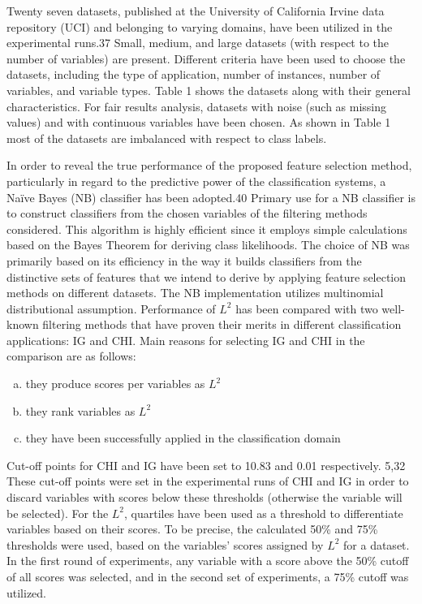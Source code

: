 \documentclass[review]{elsarticle}
\begin{document}
Twenty seven datasets, published at the University of California Irvine data repository (UCI) and belonging to varying domains, have been utilized in the experimental runs.37  Small, medium, and large datasets (with respect to the number of variables) are present. Different criteria have been used to choose the datasets, including the type of application, number of instances, number of variables, and variable types. Table 1 shows the datasets along with their general characteristics.  For fair results analysis, datasets with noise (such as missing values) and with continuous variables have been chosen. As shown in Table 1 most of the datasets are imbalanced with respect to class labels.

In order to reveal the true performance of the proposed feature selection method, particularly in regard to the predictive power of the classification systems, a Naïve Bayes (NB) classifier has been adopted.40 Primary use for a NB classifier is to construct classifiers from the chosen variables of the filtering methods considered. This algorithm is highly efficient since it employs simple calculations based on the Bayes Theorem for deriving class likelihoods. The choice of NB was primarily based on its efficiency in the way it builds classifiers from the distinctive sets of features that we intend to derive by applying feature selection methods on different datasets. The NB implementation utilizes multinomial distributional assumption. Performance of $ L^2 $ has been compared with two well-known filtering methods that have proven their merits in different classification applications: IG and CHI. Main reasons for selecting IG and CHI in the comparison are as follows:

\begin{enumerate}[(a)]
	\item they produce scores per variables as $ L^2 $
	\item they rank variables as $ L^2 $
	\item they have been successfully applied in the classification domain
	
\end{enumerate}

Cut-off points for CHI and IG have been set to 10.83 and 0.01 respectively. 5,32  These cut-off points were set in the experimental runs of CHI and IG in order to discard variables with scores below these thresholds (otherwise the variable will be selected). For the $ L^2 $, quartiles have been used as a threshold to differentiate variables based on their scores. To be precise, the calculated 50\% and 75\% thresholds were used, based on the variables’ scores assigned by $ L^2 $ for a dataset. In the first round of experiments, any variable with a score above the 50\% cutoff of all scores was selected, and in the second set of experiments, a 75\% cutoff was utilized.  
\end{document}
